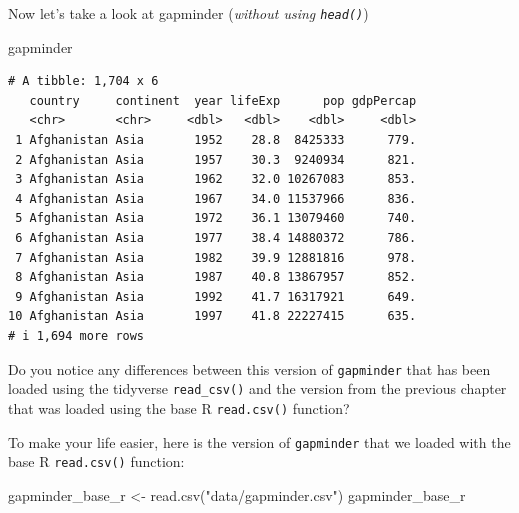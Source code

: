 \documentclass[
  letterpaper,
  DIV=11,
  numbers=noendperiod]{scrreprt}
\newenvironment{Shaded}{\begin{snugshade}}{\end{snugshade}}
\newcommand{\FunctionTok}[1]{\textcolor[rgb]{0.28,0.35,0.67}{#1}}
\newcommand{\NormalTok}[1]{\textcolor[rgb]{0.00,0.23,0.31}{#1}}
\newcommand{\OtherTok}[1]{\textcolor[rgb]{0.00,0.23,0.31}{#1}}
\newcommand{\StringTok}[1]{\textcolor[rgb]{0.13,0.47,0.30}{#1}}
\begin{document}
Now let's take a look at gapminder (\emph{without using
\texttt{head()}})

\begin{Shaded}
\begin{Highlighting}[]
\NormalTok{gapminder}
\end{Highlighting}
\end{Shaded}

\begin{verbatim}
# A tibble: 1,704 x 6
   country     continent  year lifeExp      pop gdpPercap
   <chr>       <chr>     <dbl>   <dbl>    <dbl>     <dbl>
 1 Afghanistan Asia       1952    28.8  8425333      779.
 2 Afghanistan Asia       1957    30.3  9240934      821.
 3 Afghanistan Asia       1962    32.0 10267083      853.
 4 Afghanistan Asia       1967    34.0 11537966      836.
 5 Afghanistan Asia       1972    36.1 13079460      740.
 6 Afghanistan Asia       1977    38.4 14880372      786.
 7 Afghanistan Asia       1982    39.9 12881816      978.
 8 Afghanistan Asia       1987    40.8 13867957      852.
 9 Afghanistan Asia       1992    41.7 16317921      649.
10 Afghanistan Asia       1997    41.8 22227415      635.
# i 1,694 more rows
\end{verbatim}

Do you notice any differences between this version of \texttt{gapminder}
that has been loaded using the tidyverse \texttt{read\_csv()} and the
version from the previous chapter that was loaded using the base R
\texttt{read.csv()} function?

To make your life easier, here is the version of \texttt{gapminder} that
we loaded with the base R \texttt{read.csv()} function:

\begin{Shaded}
\begin{Highlighting}[]
\NormalTok{gapminder\_base\_r }\OtherTok{\textless{}{-}} \FunctionTok{read.csv}\NormalTok{(}\StringTok{"data/gapminder.csv"}\NormalTok{)}
\NormalTok{gapminder\_base\_r}
\end{Highlighting}
\end{Shaded}
\end{document}
